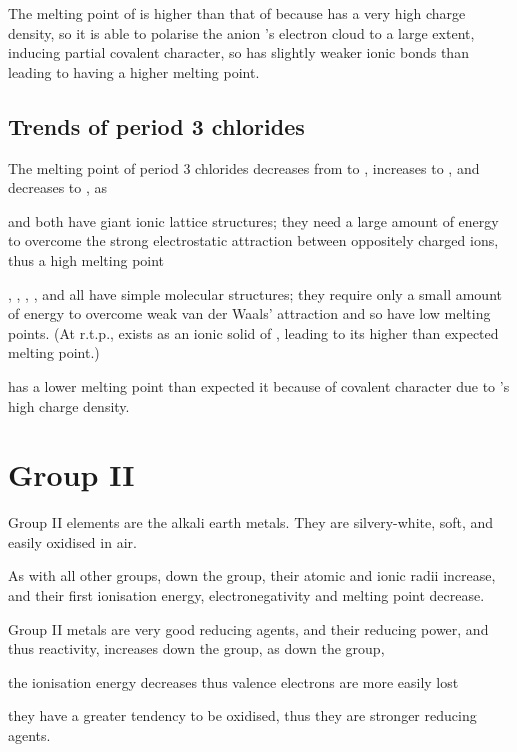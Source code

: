 \documentclass[Chemistry.tex]{subfiles}
\begin{document}
The melting point of  is higher than that of  because  has a very high charge density, so it is able to polarise the anion 's electron cloud to a large extent, inducing partial covalent character, so  has slightly weaker ionic bonds than  leading to  having a higher melting point.
\subsection{Trends of period 3 chlorides}
The melting point of period 3 chlorides decreases from  to , increases to , and decreases to , as \begin{slinenum}
\item {} and  both have giant ionic lattice structures; they need a large amount of energy to overcome the strong electrostatic attraction between oppositely charged ions, thus a high melting point
\item {}, , , , and  all have simple molecular structures; they require only a small amount of energy to overcome weak van der Waals' attraction and so have low melting points. (At r.t.p.,  exists as an ionic solid of , leading to its higher than expected melting point.)
\end{slinenum}

 has a lower melting point than expected it because of covalent character due to 's high charge density.
\section{Group II}
Group II elements are the alkali earth metals. They are silvery-white, soft, and easily oxidised in air.

As with all other groups, down the group, their atomic and ionic radii increase, and their first ionisation energy, electronegativity and melting point decrease.

Group II metals are very good reducing agents, and their reducing power, and thus reactivity, increases down the group, as down the group, \begin{slinenum}
\item the ionisation energy decreases thus valence electrons are more easily lost
\item they have a greater tendency to be oxidised, thus they are stronger reducing agents.
\end{slinenum}
\end{document}
